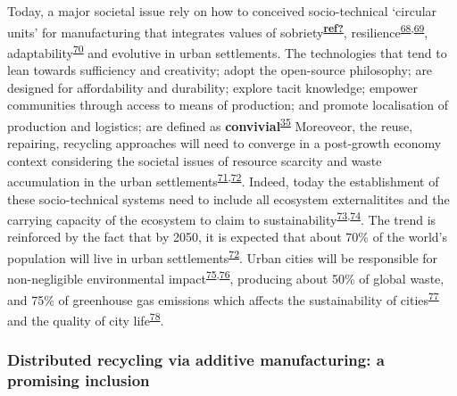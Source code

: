 \documentclass[
  12pt,
  a4paperpaper,
  onecolumn]{article}
\begin{document}
Today, a major societal issue rely on how to conceived socio-technical
`circular units' for manufacturing that integrates values of
sobriety\textsuperscript{\protect\hyperlink{ref-ref}{\textbf{ref?}}},
resilience\textsuperscript{\protect\hyperlink{ref-touriki2021}{68},\protect\hyperlink{ref-VanFan2019}{69}},
adaptability\textsuperscript{\protect\hyperlink{ref-weichhart2021}{70}}
and evolutive in urban settlements. The technologies that tend to lean
towards sufficiency and creativity; adopt the open-source philosophy;
are designed for affordability and durability; explore tacit knowledge;
empower communities through access to means of production; and promote
localisation of production and logistics; are defined as
\textbf{convivial}\textsuperscript{\protect\hyperlink{ref-priavolou2022}{35}}
Moreoveor, the reuse, repairing, recycling approaches will need to
converge in a post-growth economy context considering the societal
issues of resource scarcity and waste accumulation in the urban
settlements\textsuperscript{\protect\hyperlink{ref-kallis2018}{71},\protect\hyperlink{ref-savini2021}{72}}.
Indeed, today the establishment of these socio-technical systems need to
include all ecosystem externalitites and the carrying capacity of the
ecosystem to claim to
sustainability\textsuperscript{\protect\hyperlink{ref-Bakshi2018}{73},\protect\hyperlink{ref-Bakshi2019a}{74}}.
The trend is reinforced by the fact that by 2050, it is expected that
about 70\% of the world's population will live in urban
settlements\textsuperscript{\protect\hyperlink{ref-savini2021}{72}}.
Urban cities will be responsible for non-negligible environmental
impact\textsuperscript{\protect\hyperlink{ref-Zheng2020}{75},\protect\hyperlink{ref-Sodiq2019}{76}},
producing about 50\% of global waste, and 75\% of greenhouse gas
emissions which affects the sustainability of
cities\textsuperscript{\protect\hyperlink{ref-schraven2021}{77}} and the
quality of city
life\textsuperscript{\protect\hyperlink{ref-Riffat2016}{78}}.

\hypertarget{distributed-recycling-via-additive-manufacturing-a-promising-inclusion}{%
\subsubsection{Distributed recycling via additive manufacturing: a
promising
inclusion}\label{distributed-recycling-via-additive-manufacturing-a-promising-inclusion}}
\end{document}

